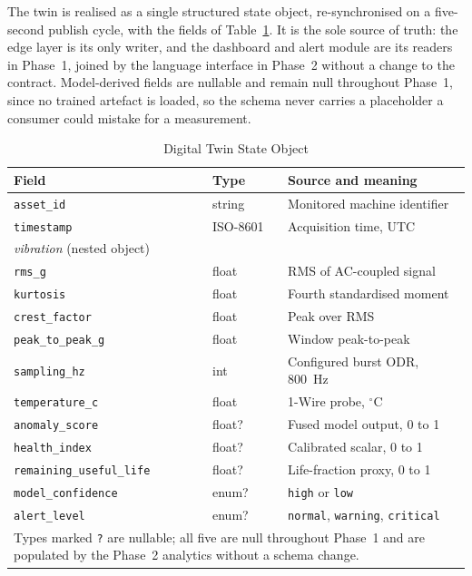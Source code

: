 \documentclass[conference]{IEEEtran}
\begin{document}
The twin is realised as a single structured state object, re-synchronised on
a five-second publish cycle, with the fields of Table~\ref{tab:state}. It is
the sole source of truth: the edge layer is its only writer, and the
dashboard and alert module are its readers in Phase~1, joined by the
language interface in Phase~2 without a change to the contract. Model-derived
fields are nullable and remain null throughout Phase~1, since no trained
artefact is loaded, so the schema never carries a placeholder a consumer
could mistake for a measurement.

\begin{table}[t]
\caption{Digital Twin State Object}
\label{tab:state}
\centering
\footnotesize
\setlength{\tabcolsep}{3pt}
\begin{tabular}{|p{3.7cm}|p{1.1cm}|p{2.6cm}|}
\hline
\textbf{Field} & \textbf{Type} & \textbf{Source and meaning} \\
\hline
\texttt{asset\_id} & string & Monitored machine identifier \\
\texttt{timestamp} & ISO-8601 & Acquisition time, UTC \\
\hline
\multicolumn{3}{|l|}{\emph{vibration} (nested object)} \\
\hline
\texttt{rms\_g} & float & RMS of AC-coupled signal \\
\texttt{kurtosis} & float & Fourth standardised moment \\
\texttt{crest\_factor} & float & Peak over RMS \\
\texttt{peak\_to\_peak\_g} & float & Window peak-to-peak \\
\texttt{sampling\_hz} & int & Configured burst ODR, 800~Hz \\
\hline
\texttt{temperature\_c} & float & 1-Wire probe, $^{\circ}$C \\
\texttt{anomaly\_score} & float? & Fused model output, 0 to 1 \\
\texttt{health\_index} & float? & Calibrated scalar, 0 to 1 \\
\texttt{remaining\_useful\_life} & float? & Life-fraction proxy, 0 to 1 \\
\texttt{model\_confidence} & enum? & \texttt{high} or \texttt{low} \\
\texttt{alert\_level} & enum? & \texttt{normal}, \texttt{warning}, \texttt{critical} \\
\hline
\multicolumn{3}{p{0.95\columnwidth}}{\scriptsize Types marked \texttt{?} are
nullable; all five are null throughout Phase~1 and are populated by the
Phase~2 analytics without a schema change.} \\
\end{tabular}
\end{table}
\end{document}
